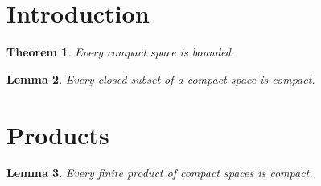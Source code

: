 \documentclass{article}
\newtheorem{theorem}{Theorem}[section]
\newtheorem{lemma}[theorem]{Lemma}
\begin{document}
\section{Introduction}
\begin{theorem} Every compact space is bounded. \end{theorem}
\begin{lemma} Every closed subset of a compact space is compact. \end{lemma}
\section{Products}
\begin{lemma} Every finite product of compact spaces is compact. \end{lemma}
\end{document}
